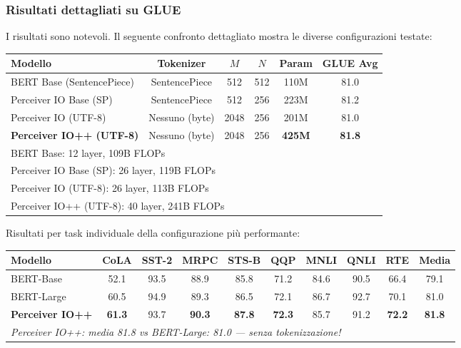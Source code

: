 \documentclass[12pt,a4paper]{article}
\begin{document}
\subsubsection{Risultati dettagliati su GLUE}

I risultati sono notevoli. Il seguente confronto dettagliato mostra le diverse configurazioni testate:

\begin{center}
\begin{tabular}{lccccc}
\toprule
\textbf{Modello} & \textbf{Tokenizer} & \textbf{$M$} & \textbf{$N$} & \textbf{Param} & \textbf{GLUE Avg} \\
\midrule
BERT Base (SentencePiece) & SentencePiece & 512 & 512 & 110M & 81.0 \\
Perceiver IO Base (SP) & SentencePiece & 512 & 256 & 223M & 81.2 \\
Perceiver IO (UTF-8) & Nessuno (byte) & 2048 & 256 & 201M & 81.0 \\
\textbf{Perceiver IO++ (UTF-8)} & Nessuno (byte) & 2048 & 256 & \textbf{425M} & \textbf{81.8} \\
\midrule
\multicolumn{6}{l}{\scriptsize BERT Base: 12 layer, 109B FLOPs} \\
\multicolumn{6}{l}{\scriptsize Perceiver IO Base (SP): 26 layer, 119B FLOPs} \\
\multicolumn{6}{l}{\scriptsize Perceiver IO (UTF-8): 26 layer, 113B FLOPs} \\
\multicolumn{6}{l}{\scriptsize Perceiver IO++ (UTF-8): 40 layer, 241B FLOPs} \\
\bottomrule
\end{tabular}
\end{center}

Risultati per task individuale della configurazione pi\`u performante:

\begin{center}
\begin{tabular}{lccccccccc}
\toprule
\textbf{Modello} & \textbf{CoLA} & \textbf{SST-2} & \textbf{MRPC} & \textbf{STS-B} & \textbf{QQP} & \textbf{MNLI} & \textbf{QNLI} & \textbf{RTE} & \textbf{Media} \\
\midrule
BERT-Base & 52.1 & 93.5 & 88.9 & 85.8 & 71.2 & 84.6 & 90.5 & 66.4 & 79.1 \\
BERT-Large & 60.5 & 94.9 & 89.3 & 86.5 & 72.1 & 86.7 & 92.7 & 70.1 & 81.0 \\
\textbf{Perceiver IO++} & \textbf{61.3} & 93.7 & \textbf{90.3} & \textbf{87.8} & \textbf{72.3} & 85.7 & 91.2 & \textbf{72.2} & \textbf{81.8} \\
\midrule
\multicolumn{10}{l}{\scriptsize\textit{Perceiver IO++: media 81.8 vs BERT-Large: 81.0 --- senza tokenizzazione!}} \\
\bottomrule
\end{tabular}
\end{center}
\end{document}
